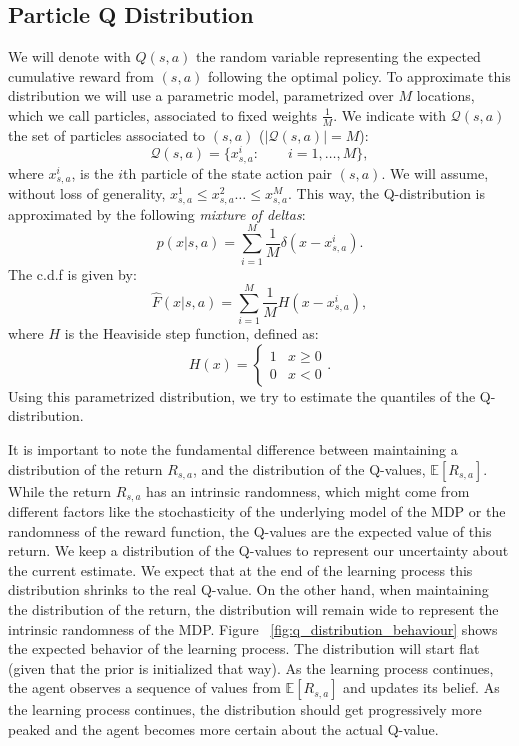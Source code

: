 \subsection{Particle Q Distribution}
We will denote with $Q(s,a)$ the random variable representing the expected cumulative reward from $(s,a)$ following the optimal policy. To approximate this distribution we will use a parametric model, parametrized over $M$ locations, which we call particles, associated to fixed weights $\frac{1}{M}$. We indicate with $\mathcal{Q}(s,a)$ the set of particles associated to $(s,a)$ ($\vert \mathcal{Q}(s,a) \vert =M$):
\begin{equation}
\mathcal{Q}(s,a)=\{x^i_{s,a}: \qquad i=1, \ldots,M \},
\end{equation}
where $x^i_{s,a}$, is the $i$th particle of the state action pair $(s,a)$. We will assume, without loss of generality, $x_{s,a}^1 \leq x_{s,a}^2 \ldots \leq x_{s,a}^M$. This way, the Q-distribution is approximated by the following \emph{mixture of deltas}:
\begin{equation}
	p(x \vert s,a)=\sum_{i=1}^{M} \frac{1}{M} \delta(x-x^i_{s,a}).
	\label{eq:particle_distribution}
\end{equation}
The c.d.f is given by:
\begin{equation}
\hat{F}(x \vert s,a) = \sum_{i=1}^{M} \frac{1}{M} H(x-x^i_{s,a}),
\end{equation}
where $H$ is the Heaviside step function, defined as:
\begin{equation}
	H(x) = \begin{cases}
    			1 & x \ge 0 \\
                0 & x < 0
    		\end{cases}.
\end{equation}
Using this parametrized distribution, we try to estimate the quantiles of the Q-distribution.\par
It is important to note the fundamental difference between maintaining a distribution of the return $R_{s,a}$, and the distribution of the Q-values, $\mathbb{E}[R_{s,a}]$. While the return $R_{s,a}$ has an intrinsic randomness, which might come from different factors  like the stochasticity of the underlying model of the MDP or the randomness of the reward function, the Q-values are the expected value of this return. We keep a distribution of the Q-values to represent our uncertainty about the current estimate. We expect that at the end of the learning process this distribution shrinks to the real Q-value. On the other hand, when maintaining the distribution of the return, the distribution will remain wide to represent the intrinsic randomness of the MDP. Figure ~\ref{fig:q_distribution_behaviour} shows the expected behavior of the learning process. The distribution will start flat (given that the prior is initialized that way). As the learning process continues, the agent observes a sequence of values from $\mathbb{E}[R_{s,a}]$ and updates its belief. As the learning process continues, the distribution should get progressively more peaked and the agent becomes more certain about the actual Q-value.\par
